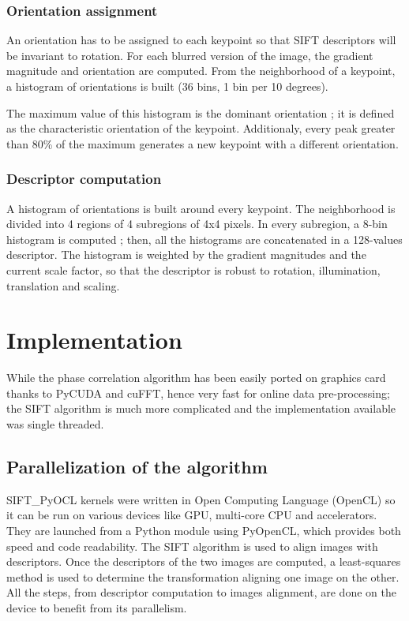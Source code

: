 \documentclass[preprint]{iucr}
\begin{document}
\subsubsection{Orientation assignment}
An orientation has to be assigned to each keypoint so that SIFT descriptors will be invariant to rotation. For each blurred version of the image, the gradient magnitude and orientation are computed. From the neighborhood of a keypoint, a histogram of orientations is built (36 bins, 1 bin per 10 degrees).

The maximum value of this histogram is the dominant orientation ; it is defined as the characteristic orientation of the keypoint. Additionaly, every peak greater than 80\% of the maximum generates a new keypoint with a different orientation.


\subsubsection{Descriptor computation}
A histogram of orientations is built around every keypoint. The neighborhood is divided into 4 regions of 4 subregions of 4x4 pixels. In every subregion, a 8-bin histogram is computed ; then, all the histograms are concatenated in a 128-values descriptor. The histogram is weighted by the gradient magnitudes and the current scale factor, so that the descriptor is robust to rotation, illumination, translation and scaling.%

\section{Implementation}
While the phase correlation algorithm has been easily ported on graphics card
thanks to PyCUDA and cuFFT, hence very fast for online data
pre-processing; 
the SIFT algorithm is much more complicated and the implementation available was
single threaded.

\subsection{Parallelization of the algorithm}
SIFT\_PyOCL kernels were written in Open Computing Language\cite{opencl} (OpenCL) so it can be run on various devices like GPU, multi-core CPU and accelerators. They are launched from a Python module using PyOpenCL\cite{pyopencl}, which provides both speed and code readability. The SIFT algorithm is used to align images with descriptors. Once the descriptors of the two images are computed, a least-squares method is used to determine the transformation aligning one image on the other.
All the steps, from descriptor computation to images alignment, are done on the device to benefit from its parallelism.
\end{document}
